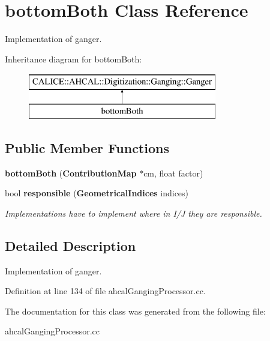 \section{bottom\-Both Class Reference}
\label{classbottomBoth}


Implementation of ganger.  


Inheritance diagram for bottom\-Both\-:\begin{figure}[H]
\begin{center}
\leavevmode
\includegraphics[height=2.000000cm]{classbottomBoth}
\end{center}
\end{figure}
\subsection*{Public Member Functions}
\begin{DoxyCompactItemize}
\item 
{\bfseries bottom\-Both} ({\bf Contribution\-Map} $\ast$cm, float factor)\label{classbottomBoth_a06933e621a94f172404ecc203acf5ac5}

\item 
bool {\bf responsible} ({\bf Geometrical\-Indices} indices)\label{classbottomBoth_abd6e0e0a8c5df530afc54e4fc43388ad}

\begin{DoxyCompactList}\small\item\em Implementations have to implement where in I/\-J they are responsible. \end{DoxyCompactList}\end{DoxyCompactItemize}


\subsection{Detailed Description}
Implementation of ganger. 

Definition at line 134 of file ahcal\-Ganging\-Processor.\-cc.



The documentation for this class was generated from the following file\-:\begin{DoxyCompactItemize}
\item 
ahcal\-Ganging\-Processor.\-cc\end{DoxyCompactItemize}
